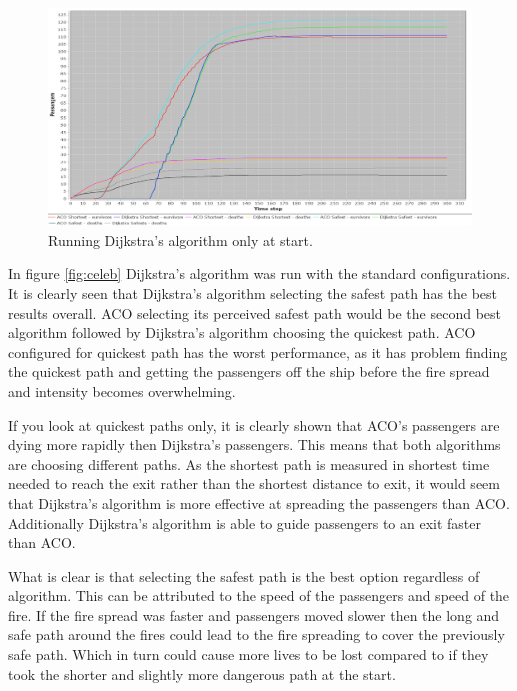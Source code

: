 \begin{figure} [h]
\centering
\hspace*{-1.0in}
\includegraphics[scale=0.35]{images/Graph-using-200-rounds-140-passangers-and-dijkstra-one-time.png}
\caption{Running Dijkstra's algorithm only at start.}
\label{fig:celebDF}
\end{figure}

In figure \ref{fig:celeb} Dijkstra's algorithm was run with the standard configurations. It is clearly seen that Dijkstra's algorithm selecting the safest path has the best results overall. ACO selecting its perceived safest path would be the second best algorithm followed by Dijkstra's algorithm choosing the quickest path. ACO configured for quickest path has the worst performance, as it has problem finding the quickest path and getting the passengers off the ship before the fire spread and intensity becomes overwhelming.

If you look at quickest paths only, it is clearly shown that ACO's passengers are dying more rapidly then Dijkstra's passengers. This means that both algorithms are choosing different paths. As the shortest path is measured in shortest time needed to reach the exit rather than the shortest distance to exit, it would seem that Dijkstra's algorithm is more effective at spreading the passengers than ACO. Additionally Dijkstra's algorithm is able to guide passengers to an exit faster than ACO.

What is clear is that selecting the safest path is the best option regardless of algorithm. This can be attributed to the speed of the passengers and speed of the fire. If the fire spread was faster and passengers moved slower then the long and safe path around the fires could lead to the fire spreading to cover the previously safe path. Which in turn could cause more lives to be lost compared to if they took the shorter and slightly more dangerous path at the start.

